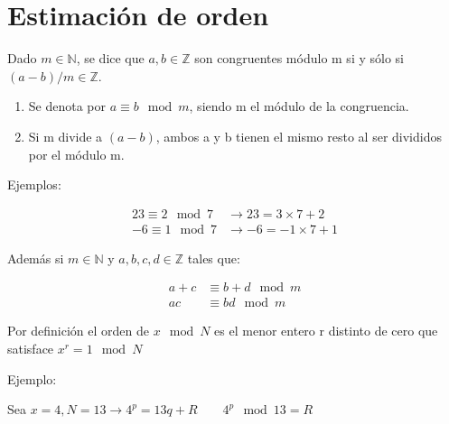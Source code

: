 \section{Estimación de orden}

Dado $m \in \mathds{N}$, se dice que $a,b \in \mathds{Z}$ son congruentes módulo m si y sólo si $(a-b)/m \in \mathds{Z}$.

\begin{enumerate}
    \item Se denota por $a \equiv b \mod m$, siendo m el módulo de la congruencia.
    \item Si m divide a $(a-b)$, ambos a y b tienen el mismo resto al ser divididos por el módulo m.
\end{enumerate}

 Ejemplos:

\begin{align*}
    23 \equiv 2 \mod 7 &\rightarrow 23 = 3 \times 7 + 2 \\
    -6 \equiv 1 \mod 7 &\rightarrow -6 = -1 \times 7 +1
\end{align*}

 Además si $m \in \mathds{N}$ y $a,b,c,d \in \mathds{Z}$ tales que:

\begin{align*}
    a+c &\equiv b+d \mod m \\
    a c &\equiv b d \mod m
\end{align*}

 Por definición el orden de $x \mod N$ es el menor entero r distinto de cero que satisface $x^r = 1 \mod N$
 
Ejemplo:

 Sea $x = 4, N = 13 \rightarrow 4^p = 13 q + R \qquad 4^p \mod 13 = R$

